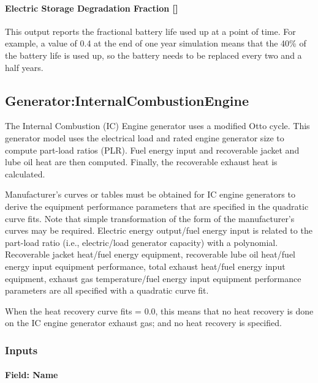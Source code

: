 \paragraph{Electric Storage Degradation Fraction {[]}}\label{electric-storage-degradation-fraction}

This output reports the fractional battery life used up at a point of time. For example, a value of 0.4 at the end of one year simulation means that the 40\% of the battery life is used up, so the battery needs to be replaced every two and a half years.

\subsection{Generator:InternalCombustionEngine}\label{generatorinternalcombustionengine}

The Internal Combustion (IC) Engine generator uses a modified Otto cycle. This generator model uses the electrical load and rated engine generator size to compute part-load ratios (PLR). Fuel energy input and recoverable jacket and lube oil heat are then computed. Finally, the recoverable exhaust heat is calculated.

Manufacturer's curves or tables must be obtained for IC engine generators to derive the equipment performance parameters that are specified in the quadratic curve fits. Note that simple transformation of the form of the manufacturer's curves may be required. Electric energy output/fuel energy input is related to the part-load ratio (i.e., electric/load generator capacity) with a polynomial. Recoverable jacket heat/fuel energy equipment, recoverable lube oil heat/fuel energy input equipment performance, total exhaust heat/fuel energy input equipment, exhaust gas temperature/fuel energy input equipment performance parameters are all specified with a quadratic curve fit.

When the heat recovery curve fits = 0.0, this means that no heat recovery is done on the IC engine generator exhaust gas; and no heat recovery is specified.

\subsubsection{Inputs}\label{inputs-7-007}

\paragraph{Field: Name}\label{field-name-8-004}

